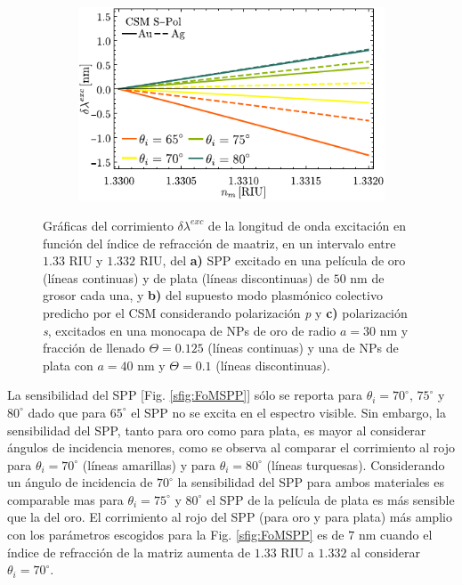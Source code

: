 \begin{figure}[h!]
	\begin{subfigure}{.45\linewidth}\centering
	\includegraphics[scale=1]{2-Resultados/figs/11-SPPCSM/6_Sens_h20_CSMS.pdf}\end{subfigure}\vspace*{-.5em}
	\caption{Gráficas del corrimiento $\delta\lambda^{exc}$ de la longitud de onda excitación  en función del índice de refracción de maatriz, en un intervalo entre $1.33$ RIU y $1.332$ RIU, del \textbf{a)} SPP excitado en una película de oro (líneas continuas) y de plata (líneas discontinuas) de $50$ nm de grosor cada una, y  \textbf{b)} del supuesto modo  plasmónico colectivo predicho por el CSM considerando polarización \emph{p} y \textbf{c)}  polarización \emph{s}, excitados en una monocapa de NPs de oro de radio $a=30$ nm y fracción de llenado $\Theta=0.125$ (líneas continuas) y una de NPs de plata con $a=40$ nm y $\Theta=0.1$ (líneas discontinuas).}\label{fig:FoMSPPCSM}
	\end{figure}	

La sensibilidad del SPP [Fig. \ref{sfig:FoMSPP}] sólo se reporta para $\theta_i=70^\circ,\, 75^\circ$ y $80^\circ$ dado que para $65^\circ$ el SPP no se excita en el espectro visible. Sin embargo, la sensibilidad del SPP, tanto para oro como para plata, es mayor al considerar ángulos de incidencia  menores, como se observa al comparar el corrimiento al rojo para $\theta_i=70^\circ$ (líneas amarillas) y  para $\theta_i=80^\circ$ (líneas turquesas).  Considerando un ángulo de incidencia de $70^\circ$ la sensibilidad del SPP para ambos materiales es comparable mas para $\theta_i=75^\circ$ y $80^\circ$ el SPP de la película de plata es más sensible que la del oro. El corrimiento al rojo del SPP (para oro y para plata) más amplio con los parámetros escogidos para la Fig. \ref{sfig:FoMSPP} es de $7$ nm cuando el índice de refracción de la matriz  aumenta de $1.33$ RIU a $1.332$ al considerar $\theta_i=70^\circ$.

